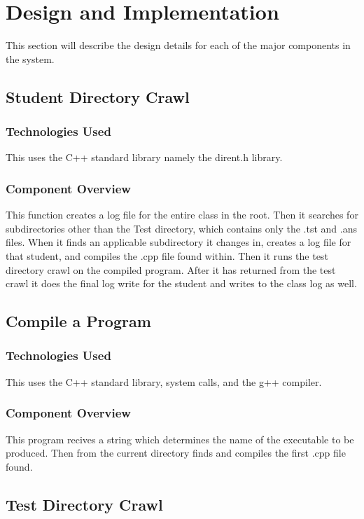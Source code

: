 \chapter{Design  and Implementation}
This section will describe the design details for each of the major components 
in the system. 
 
\section{Student Directory Crawl}

\subsection {Technologies Used}
This uses the C++ standard library namely the dirent.h library.

\subsection{Component Overview}
This function creates a log file for the entire class in the root.  Then it searches for subdirectories other than the
Test directory, which contains only the .tst and .ans files.  When it finds an applicable subdirectory it changes in,
creates a log file for that student, and compiles the .cpp file found within.  Then it runs the test directory crawl
on the compiled program.  After it has returned from the test crawl it does the final log write for the student and
writes to the class log as well.


\section {Compile a Program}

\subsection {Technologies Used}
This uses the C++ standard library, system calls, and the g++ compiler.

\subsection{Component Overview}
This program recives a string which determines the name of the executable to be produced.  Then from the
current directory finds and compiles the first .cpp file found.

\section{Test Directory Crawl}

